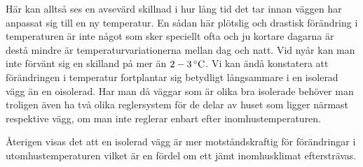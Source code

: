Här kan alltså ses en avsevärd skillnad i hur lång tid det tar innan väggen har anpassat sig till en ny temperatur. En sådan här plötslig och drastisk förändring i temperaturen är inte något som sker speciellt ofta och ju kortare dagarna är destå mindre är temperaturvariationerna mellan dag och natt. \cite{SMHItempskillnad}
Vid nyår kan man inte förvänt sig en skilland på mer än $\unit[2-3]{^\circ C}$. Vi kan ändå konstatera att förändringen i temperatur fortplantar sig betydligt långsammare i en isolerad vägg än en oisolerad. Har man då väggar som är olika bra isolerade behöver man troligen även ha två olika reglersystem för de delar av huset som ligger närmast respektive vägg, om man inte reglerar enbart efter inomhustemperaturen. 

Återigen visas det att en isolerad vägg är mer motståndskraftig för förändringar i utomhustemperaturen vilket är en fördel om ett jämt inomhusklimat eftersträvas.
